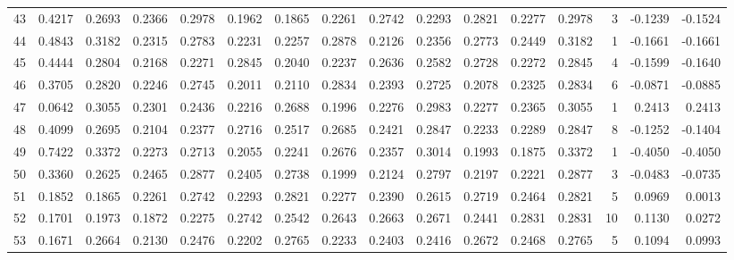 \begin{tabular}{lrrrrrrrrrrrrrrr}
43  &      0.4217 &  0.2693 &  0.2366 &  0.2978 &  0.1962 &  0.1865 &  0.2261 &  0.2742 &  0.2293 &  0.2821 &   0.2277 &     0.2978 &      3 &                   -0.1239 &                    -0.1524 \\
44  &      0.4843 &  0.3182 &  0.2315 &  0.2783 &  0.2231 &  0.2257 &  0.2878 &  0.2126 &  0.2356 &  0.2773 &   0.2449 &     0.3182 &      1 &                   -0.1661 &                    -0.1661 \\
45  &      0.4444 &  0.2804 &  0.2168 &  0.2271 &  0.2845 &  0.2040 &  0.2237 &  0.2636 &  0.2582 &  0.2728 &   0.2272 &     0.2845 &      4 &                   -0.1599 &                    -0.1640 \\
46  &      0.3705 &  0.2820 &  0.2246 &  0.2745 &  0.2011 &  0.2110 &  0.2834 &  0.2393 &  0.2725 &  0.2078 &   0.2325 &     0.2834 &      6 &                   -0.0871 &                    -0.0885 \\
47  &      0.0642 &  0.3055 &  0.2301 &  0.2436 &  0.2216 &  0.2688 &  0.1996 &  0.2276 &  0.2983 &  0.2277 &   0.2365 &     0.3055 &      1 &                    0.2413 &                     0.2413 \\
48  &      0.4099 &  0.2695 &  0.2104 &  0.2377 &  0.2716 &  0.2517 &  0.2685 &  0.2421 &  0.2847 &  0.2233 &   0.2289 &     0.2847 &      8 &                   -0.1252 &                    -0.1404 \\
49  &      0.7422 &  0.3372 &  0.2273 &  0.2713 &  0.2055 &  0.2241 &  0.2676 &  0.2357 &  0.3014 &  0.1993 &   0.1875 &     0.3372 &      1 &                   -0.4050 &                    -0.4050 \\
50  &      0.3360 &  0.2625 &  0.2465 &  0.2877 &  0.2405 &  0.2738 &  0.1999 &  0.2124 &  0.2797 &  0.2197 &   0.2221 &     0.2877 &      3 &                   -0.0483 &                    -0.0735 \\
51  &      0.1852 &  0.1865 &  0.2261 &  0.2742 &  0.2293 &  0.2821 &  0.2277 &  0.2390 &  0.2615 &  0.2719 &   0.2464 &     0.2821 &      5 &                    0.0969 &                     0.0013 \\
52  &      0.1701 &  0.1973 &  0.1872 &  0.2275 &  0.2742 &  0.2542 &  0.2643 &  0.2663 &  0.2671 &  0.2441 &   0.2831 &     0.2831 &     10 &                    0.1130 &                     0.0272 \\
53  &      0.1671 &  0.2664 &  0.2130 &  0.2476 &  0.2202 &  0.2765 &  0.2233 &  0.2403 &  0.2416 &  0.2672 &   0.2468 &     0.2765 &      5 &                    0.1094 &                     0.0993 \\

\end{tabular}

